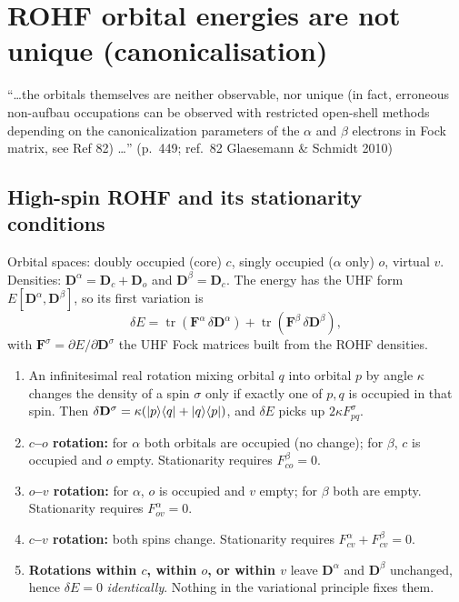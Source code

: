 \section{ROHF orbital energies are not unique (canonicalisation)}\label{sec:rohf}

\begin{reviewclaim}
``\dots the orbitals themselves are neither observable, nor unique (in fact, erroneous non-aufbau
occupations can be observed with restricted open-shell methods depending on the canonicalization
parameters of the $\alpha$ and $\beta$ electrons in Fock matrix, see Ref 82) \dots'' (p.~449; ref.~82
Glaesemann \& Schmidt 2010)
\end{reviewclaim}

\subsection{High-spin ROHF and its stationarity conditions}
Orbital spaces: doubly occupied (core) $c$, singly occupied ($\alpha$ only) $o$, virtual $v$. Densities:
$\mathbf D^\alpha=\mathbf D_c+\mathbf D_o$ and $\mathbf D^\beta=\mathbf D_c$. The energy has the UHF form
$E[\mathbf D^\alpha,\mathbf D^\beta]$, so its first variation is
\begin{equation}\label{eq:dE}
  \delta E=\operatorname{tr}(\mathbf F^\alpha\,\delta\mathbf D^\alpha)+\operatorname{tr}(\mathbf F^\beta\,\delta\mathbf D^\beta),
\end{equation}
with $\mathbf F^\sigma=\partial E/\partial\mathbf D^\sigma$ the UHF Fock matrices built from the ROHF densities.
\begin{enumerate}
  \item An infinitesimal real rotation mixing orbital $q$ into orbital $p$ by angle $\kappa$ changes the density of a
        spin $\sigma$ only if exactly one of $p,q$ is occupied in that spin. Then
        $\delta\mathbf D^\sigma=\kappa(\lvert p\rangle\langle q\rvert+\lvert q\rangle\langle p\rvert)$, and $\delta E$ picks up $2\kappa F^\sigma_{pq}$.
  \item \textbf{$c$--$o$ rotation:} for $\alpha$ both orbitals are occupied (no change); for $\beta$, $c$ is occupied
        and $o$ empty. Stationarity requires $F^\beta_{co}=0$.
  \item \textbf{$o$--$v$ rotation:} for $\alpha$, $o$ is occupied and $v$ empty; for $\beta$ both are empty.
        Stationarity requires $F^\alpha_{ov}=0$.
  \item \textbf{$c$--$v$ rotation:} both spins change. Stationarity requires $F^\alpha_{cv}+F^\beta_{cv}=0$.
  \item \textbf{Rotations within $c$, within $o$, or within $v$} leave $\mathbf D^\alpha$ and $\mathbf D^\beta$ unchanged, hence
        $\delta E=0$ \emph{identically}. Nothing in the variational principle fixes them.
\end{enumerate}

